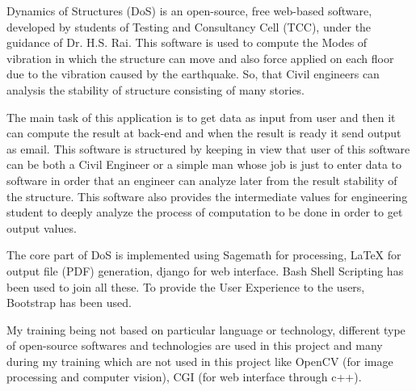 Dynamics of Structures (DoS) is an open-source, free web-based software, developed by students of 
Testing and Consultancy Cell (TCC), under the guidance of Dr. H.S. Rai. This software is used to compute the 
Modes of vibration in which the structure can move and also force applied on each floor 
due to the vibration caused by the earthquake. So, that Civil engineers can
analysis the stability of structure consisting of many stories.

 The main task of this application is to get data as input from user and then it can compute 
the result at back-end and when the result is ready it send output as email.
This software is structured by keeping in view that user of this software can be both 
a Civil Engineer or a simple man whose job is just to enter data to software 
in order that an engineer can analyze later from the result stability of the structure.
This software also provides the intermediate values for engineering student 
to deeply analyze the process of computation to be done in order to get output values.


The core part of DoS is implemented using Sagemath for processing,  \LaTeX{} for output file (PDF) generation, django 
for web interface. Bash Shell Scripting has been used to join all these. To provide the User Experience to the users, 
Bootstrap has been used.


My training being not based on particular language or technology, different type of open-source softwares and technologies are 
used in this project and many during my training which are not used in this 
project like OpenCV (for image processing and computer vision), CGI (for web interface through c++).
